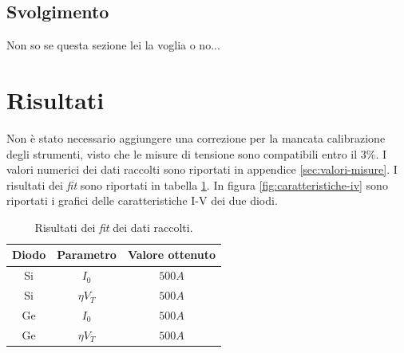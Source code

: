 \documentclass[11pt, a4paper, twoside]{article}
\begin{document}
  \subsection{Svolgimento}\label{subsec:svolgimento}
  Non so se questa sezione lei la voglia o no...

\section{Risultati}\label{sec:risultati}
  Non è stato necessario aggiungere una correzione per la mancata calibrazione degli strumenti, visto che le misure di
  tensione sono compatibili entro il $3\%$. %
  I valori numerici dei dati raccolti sono riportati in appendice \ref{sec:valori-misure}.
  I risultati dei \emph{fit} sono riportati in tabella \ref{tab:risultati-fit}.
  In figura \ref{fig:caratteristiche-iv} sono riportati i grafici delle caratteristiche I-V dei due diodi.
  \begin{table}[H]
    \centering
    \begin{tabular}[t]{ccc}
      \toprule
      Diodo& Parametro &Valore ottenuto\\
      \midrule
      Si & $I_0$ &  $500A$ \\
      Si & $\eta V_T$ &  $500A$ \\
      Ge & $I_0$ &  $500A$ \\
      Ge & $\eta V_T$ &  $500A$ \\
      \bottomrule
      \end{tabular}
    \caption{
      Risultati dei \emph{fit} dei dati raccolti.
    }
    \label{tab:risultati-fit}
  \end{table}
\end{document}

